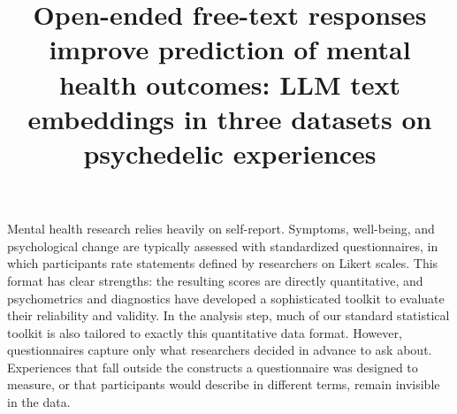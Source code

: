 \documentclass[man,floatsintext]{apa7}
\title{Open-ended free-text responses improve prediction of mental health outcomes: LLM text embeddings in three datasets on psychedelic experiences}
\begin{document}
	\maketitle

\noindent{}


Mental health research relies heavily on self-report. Symptoms, well-being, and psychological change are typically assessed with standardized questionnaires, in which participants rate statements defined by researchers on Likert scales. This format has clear strengths: the resulting scores are directly quantitative, and psychometrics and diagnostics have developed a sophisticated toolkit to evaluate their reliability and validity. In the analysis step, much of our standard statistical toolkit is also tailored to exactly this quantitative data format. However, questionnaires capture only what researchers decided in advance to ask about. Experiences that fall outside the constructs a questionnaire was designed to measure, or that participants would describe in different terms, remain invisible in the data.
\end{document}

